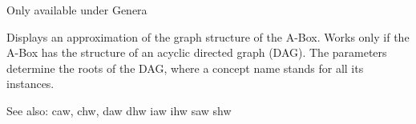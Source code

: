  


Only available under Genera

Displays an approximation of the graph structure of the A-Box. Works only
if the A-Box has the structure of an acyclic directed graph (DAG). The
parameters determine the roots of the DAG, where a concept name stands
for all its instances.

See also: caw, chw, daw dhw iaw ihw saw shw

